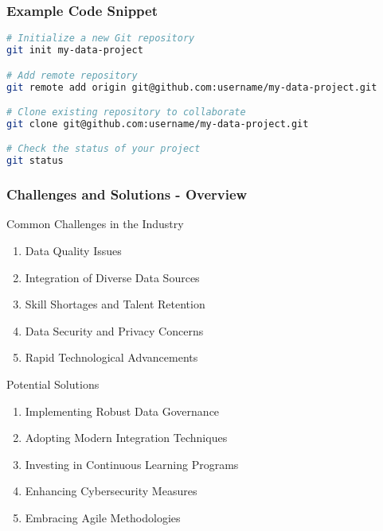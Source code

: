 \documentclass{beamer}
\begin{document}
\begin{frame}[fragile]
    \frametitle{Example Code Snippet}
    \begin{lstlisting}[language=bash]
# Initialize a new Git repository
git init my-data-project

# Add remote repository
git remote add origin git@github.com:username/my-data-project.git

# Clone existing repository to collaborate
git clone git@github.com:username/my-data-project.git

# Check the status of your project
git status
    \end{lstlisting}
\end{frame}

\begin{frame}[fragile]
    \frametitle{Challenges and Solutions - Overview}
    \begin{block}{Common Challenges in the Industry}
        \begin{enumerate}
            \item Data Quality Issues
            \item Integration of Diverse Data Sources
            \item Skill Shortages and Talent Retention
            \item Data Security and Privacy Concerns
            \item Rapid Technological Advancements
        \end{enumerate}
    \end{block}
    \begin{block}{Potential Solutions}
        \begin{enumerate}
            \item Implementing Robust Data Governance
            \item Adopting Modern Integration Techniques
            \item Investing in Continuous Learning Programs
            \item Enhancing Cybersecurity Measures
            \item Embracing Agile Methodologies
        \end{enumerate}
    \end{block}
\end{frame}
\end{document}
